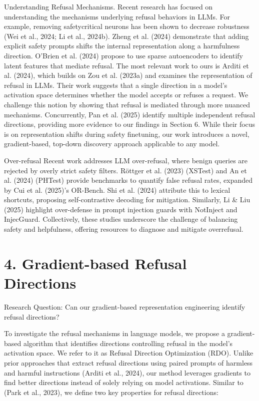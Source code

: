 \documentclass[10pt]{article}
\begin{document}
Understanding Refusal Mechanisms. Recent research has focused on understanding the mechanisms underlying refusal behaviors in LLMs. For example, removing safetycritical neurons has been shown to decrease robustness (Wei et al., 2024; Li et al., 2024b). Zheng et al. (2024) demonstrate that adding explicit safety prompts shifts the internal representation along a harmfulness direction. O'Brien et al. (2024) propose to use sparse autoencoders to identify latent features that mediate refusal. The most relevant work to ours is Arditi et al. (2024), which builds on Zou et al. (2023a) and examines the representation of refusal in LLMs. Their work suggests that a single direction in a model's activation space determines whether the model accepts or refuses a request. We challenge this notion by showing that refusal is mediated through more nuanced mechanisms. Concurrently, Pan et al. (2025) identify multiple independent refusal directions, providing more evidence to our findings in Section 6. While their focus is on representation shifts during safety finetuning, our work introduces a novel, gradient-based, top-down discovery approach applicable to any model.

Over-refusal Recent work addresses LLM over-refusal, where benign queries are rejected by overly strict safety filters. Röttger et al. (2023) (XSTest) and An et al. (2024) (PHTest) provide benchmarks to quantify false refusal rates, expanded by Cui et al. (2025)'s OR-Bench. Shi et al. (2024) attribute this to lexical shortcuts, proposing self-contrastive decoding for mitigation. Similarly, Li \& Liu (2025) highlight over-defense in prompt injection guards with NotInject and InjecGuard. Collectively, these studies underscore the challenge of balancing safety and helpfulness, offering resources to diagnose and mitigate overrefusal.

\section*{4. Gradient-based Refusal Directions}
\begin{displayquote}
Research Question: Can our gradient-based representation engineering identify refusal directions?
\end{displayquote}

To investigate the refusal mechanisms in language models, we propose a gradient-based algorithm that identifies directions controlling refusal in the model's activation space. We refer to it as Refusal Direction Optimization (RDO). Unlike prior approaches that extract refusal directions using paired prompts of harmless and harmful instructions (Arditi et al., 2024), our method leverages gradients to find better directions instead of solely relying on model activations. Similar to (Park et al., 2023), we define two key properties for refusal directions:
\end{document}
